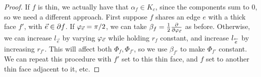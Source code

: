 \begin{proof}
If $f$ is thin, we actually have that $\alpha_f \in K_c$,
since the components sum to 0, so we need a different approach.
First suppose $f$ shares an edge $e$ with a thick face $f'$,
with $\vec{e} \in \partial f$.
If $\varphi_{\vec{e}} = \pi/2$, we can take
$\beta_f = \frac{1}{2} {\frac{\partial}{\partial \varphi_{\vec{e}}}}$ as before.
Otherwise, we can increase $l_{\vec{e}}$
by varying $\varphi_{\vec{e}}$
while holding $r_f$ constant,
and increase $l_{\overset{\leftarrow}{e}}$
by increasing $r_{f'}$.
This will affect both $\Phi_f, \Phi_{f'}$,
so we use $\beta_{f'}$ to make $\Phi_{f'}$ constant.
We can repeat this procedure with $f'$ set to this thin face,
and $f$ set to another thin face adjacent to it, etc.
\end{proof}

